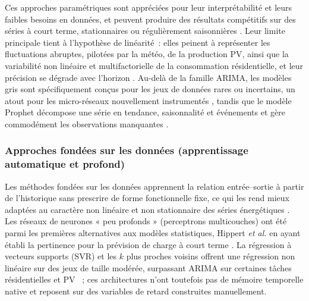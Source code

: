 Ces approches paramétriques sont appréciées pour leur interprétabilité et leurs faibles besoins en données, et peuvent produire des résultats compétitifs sur des séries à court terme, stationnaires ou régulièrement saisonnières \cite{mustafa_forecasting_2025}. Leur limite principale tient à l'hypothèse de linéarité~: elles peinent à représenter les fluctuations abruptes, pilotées par la météo, de la production PV, ainsi que la variabilité non linéaire et multifactorielle de la consommation résidentielle, et leur précision se dégrade avec l'horizon \cite{hamdoun_energy_2021, mustafa_forecasting_2025}. Au-delà de la famille ARIMA, les modèles gris sont spécifiquement conçus pour les jeux de données rares ou incertains, un atout pour les micro-réseaux nouvellement instrumentés \cite{mustafa_forecasting_2025}, tandis que le modèle Prophet décompose une série en tendance, saisonnalité et événements et gère commodément les observations manquantes \cite{mustafa_forecasting_2025, hasan_state---art_2025}.

\subsubsection{Approches fondées sur les données (apprentissage automatique et profond)}

Les méthodes fondées sur les données apprennent la relation entrée--sortie à partir de l'historique sans prescrire de forme fonctionnelle fixe, ce qui les rend mieux adaptées au caractère non linéaire et non stationnaire des séries énergétiques \cite{hamdoun_energy_2021, hasan_state---art_2025}. Les réseaux de neurones « peu profonds » (perceptrons multicouches) ont été parmi les premières alternatives aux modèles statistiques, Hippert \textit{et al.} en ayant établi la pertinence pour la prévision de charge à court terme \cite{hippert_neural_2001}. La régression à vecteurs supports (SVR) et les $k$ plus proches voisins offrent une régression non linéaire sur des jeux de taille modérée, surpassant ARIMA sur certaines tâches résidentielles et PV \cite{hamdoun_energy_2021}~; ces architectures n'ont toutefois pas de mémoire temporelle native et reposent sur des variables de retard construites manuellement.

